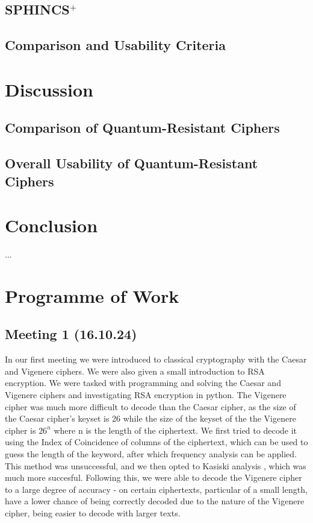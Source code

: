 \documentclass{article}
\begin{document}
\subsection{SPHINCS$^+$}
\subsection{Comparison and Usability Criteria}

\section{Discussion}

\subsection{Comparison of Quantum-Resistant Ciphers}
\subsection{Overall Usability of Quantum-Resistant Ciphers}

\section{Conclusion}
   ...

\section{Programme of Work}
\subsection{Meeting 1 (16.10.24)}
In our first meeting we were introduced to classical cryptography with the
Caesar and Vigenere ciphers. We were also given a small introduction to RSA
encryption. We were tasked with programming and solving the Caesar and Vigenere
ciphers and investigating RSA encryption in python. The Vigenere cipher was
much more difficult to decode than the Caesar cipher, as the size of the Caesar
cipher's keyset is 26 while the size of the keyset of the the Vigenere cipher
is $ 26^n $ where n is the length of the ciphertext. We first tried to decode
it using the Index of Coincidence \cite{ioc} of columns of the ciphertext,
which can be used to guess the length of the keyword, after which frequency
analysis can be applied. This method was unsuccessful, and we then opted to
Kasiski analysis \cite{kasiski}, which was much more succesful. Following this,
we were able to decode the Vigenere cipher to a large degree of accuracy - on
certain ciphertexts, particular of a small length, have a lower chance of being
correctly decoded due to the nature of the Vigenere cipher, being easier to
decode with larger texts.
\end{document}
